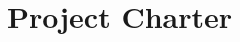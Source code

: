 
\chapter{Project Charter}

\newcommand{\ESCOMPchSec}[1]{\rowcolor{colorAgua}\multicolumn{4}{|c|}{\bf #1}\\\hline}
\newcommand{\ESCOMPchItem}[2]{{\bf {#1}} & \multicolumn{3}{p{.66\textwidth}|}{#2}\\\hline}
\newcommand{\ESCOMPchSubItem}[3]{{\bf {#1}} & {#2} & \multicolumn{2}{p{.44\textwidth}|}{#3}\\\hline}
\newcommand{\ESCOMPchSubSubItem}[4]{{\bf {#1}} & {#2} & {#3}& {#4}\\\hline}

\cleardoublepage
{\bigskip\\}
